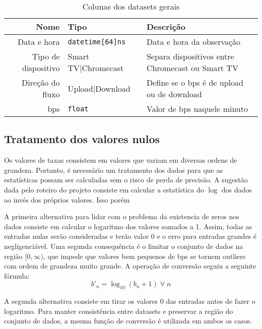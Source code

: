 \documentclass{article}
\begin{document}
\begin{table}[h]
	\centering
	\begin{tabular}{rll}
		\toprule
		Nome                & Tipo                    & Descrição                                        \\
		\midrule
		Data e hora         & \texttt{datetime[64]ns} & Data e hora da observação                        \\
		Tipo de dispositivo & Smart TV|Chromecast     & Separa dispositivos entre Chromecast ou Smart TV \\
		Direção do fluxo    & Upload|Download         & Define se o bps é de upload ou de download       \\
		bps                 & \texttt{float}          & Valor de bps naquele minuto                      \\
	\end{tabular}
	\caption{Colunas dos datasets gerais}
	\label{tab:colunas_dataset}
\end{table}


\subsection{Tratamento dos valores nulos}

Os valores de taxas consistem em valores que variam em diversas ordens de grandeza. Portanto, é necessário um tratamento dos dados para que as estatísticas possam ser calculadas sem o risco de perda de precisão. A sugestão dada pelo roteiro do projeto consiste em calcular a estatística do $\log$ dos dados ao invés dos próprios valores. Isso porém

A primeira alternativa para lidar com o problema da existencia de zeros nos dados consiste em calcular o logaritmo dos valores somados a 1. Assim, todas as entradas nulas serão consideradas e terão valor 0 e o erro para entradas grandes é negligenciável. Uma segunda consequência é o limitar o conjunto de dados na região $[0,\infty)$, que impede que valores bem pequenos de bps se tornem outliers com ordem de grandeza muito grande. A operação de conversão seguiu a seguinte fórmula:
\begin{equation*}
	b'_n = \log_{10}(b_n+1)\;\forall\;n
\end{equation*}

A segunda alternativa consiste em tirar os valores 0 das entradas antes de fazer o logaritmo. Para manter consistência entre datasets e preservar a região do conjunto de dados, a mesma função de conversão é utilizada em ambos os casos.
\end{document}
